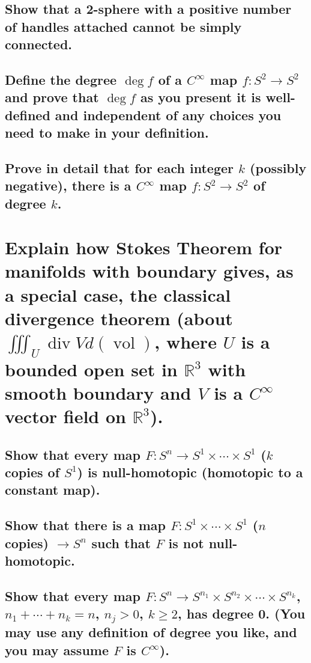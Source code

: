 \documentclass[10pt]{article}
\DeclareMathOperator{\dev}{div}
\DeclareMathOperator{\vol}{vol}
\newcommand{\advsection}{\addtocounter{section}{1} \setcounter{subsection}{0}}
\begin{document}
\subsection{Show that a 2-sphere with a positive number of handles attached cannot be simply
  connected.}

\advsection{}

\subsection{Define the degree $\deg f$ of a $C^\infty$ map $f: S^2 \to S^2$ and prove that $\deg f$
  as you present it is well-defined and independent of any choices you need to make in your
  definition.}

\subsection{Prove in detail that for each integer $k$ (possibly negative), there is a $C^\infty$ map
  $f: S^2 \to S^2$ of degree $k$.}

\section{Explain how Stokes Theorem for manifolds with boundary gives, as a special case, the
  classical divergence theorem (about $\iiint_U \dev V d(\vol )$, where $U$ is a bounded open set in
  $\mathbb{R}^3$ with smooth boundary and $V$ is a $C^\infty$ vector field on $\mathbb{R}^3$).}

\advsection{}

\subsection{Show that every map $F: S^n \to S^1 \times \cdots \times S^1$ ($k$ copies of $S^1$) is
  null-homotopic (homotopic to a constant map).}

\subsection{Show that there is a map $F: S^1 \times \cdots \times S^1$ ($n$ copies) $ \to S^n$ such
  that $F$ is not null-homotopic.}

\subsection{Show that every map $F: S^n \to S^{n_1} \times S^{n_2} \times \cdots \times S^{n_k}$,
  $n_1 + \cdots + n_k = n$, $n_j > 0$, $k\geq 2$, has degree 0. (You may use any definition of
  degree you like, and you may assume $F$ is $C^\infty$).}
\end{document}
